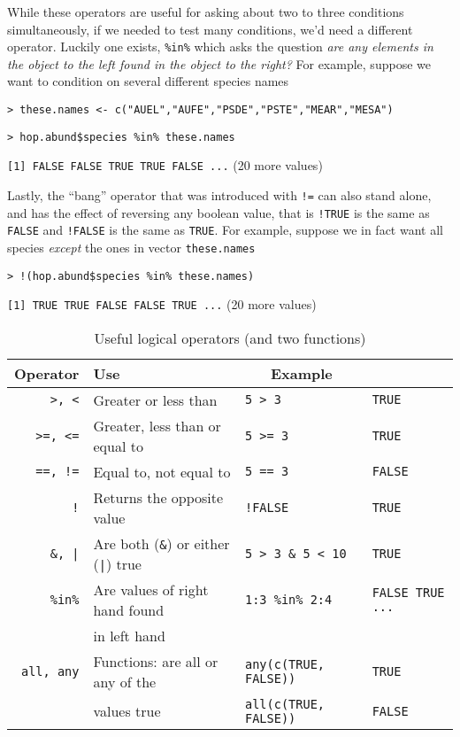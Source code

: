 \documentclass[12pt]{article}
\newcommand{\R}[1] {
	\item \texttt{#1}
}
\newenvironment{verbatim}{ 
	\indent
	\begin{list}{}{\setlength{\itemsep}{-1.5mm}}
}{
	\end{list}
}
\begin{document}
While these operators are useful for asking about two to three conditions simultaneously, if we needed to test many conditions, we'd need a different operator.  Luckily one exists, \texttt{\%in\%} which asks the question \emph{are any elements in the object to the left found in the object to the right?}  For example, suppose we want to condition on several different species names
\begin{verbatim}
	\R{> these.names <- c("AUEL","AUFE","PSDE","PSTE","MEAR","MESA")}
	\R{> hop.abund\$species \%in\% these.names}
	\R{[1] FALSE FALSE TRUE TRUE FALSE ...} (20 more values)
\end{verbatim}

Lastly, the ``bang'' operator that was introduced with \verb+!=+ can also stand alone, and has the effect of reversing any boolean value, that is \verb+!TRUE+ is the same as \verb+FALSE+ and \verb+!FALSE+ is the same as \verb+TRUE+.  For example, suppose we in fact want all species \emph{except} the ones in vector \verb+these.names+
\begin{verbatim}
	\R{> !(hop.abund\$species \%in\% these.names)}
	\R{[1] TRUE TRUE FALSE FALSE TRUE ...} (20 more values)
\end{verbatim}

\begin{table}[!htb]
	\caption{Useful logical operators (and two functions)}
	\begin{tabular}{r l l l}
		\hline
		Operator 		&	\multicolumn{1}{l}{Use}					&	\multicolumn{1}{c}{Example}				\\
		\hline
		\verb+>, <+	&	Greater or less than						&	\verb+5 > 3+			&	\verb+TRUE+	\\
		\verb+>=, <=+	&	Greater, less than or equal to				&	\verb+5 >= 3+			&	\verb+TRUE+	\\
		\verb+==, !=+	&	Equal to, not equal to					&	\verb+5 == 3+			&	\verb+FALSE+	\\
		\verb+!+		&	Returns the opposite value				&	\verb+!FALSE+			&	\verb+TRUE+ 	\\
		\texttt{\&, |}		&	Are both (\texttt{\&}) or either (\verb+|+) true	&	\texttt{5 > 3 \& 5 < 10}	&	\verb+TRUE+	\\
		\texttt{\%in\%}	&	Are values of right hand found			 	&	\texttt{1:3 \%in\% 2:4}	&	\verb+FALSE TRUE ...+	\\
					&	in left hand							&						&				\\
		\verb+all, any+	&	Functions: are all or any of the  			&	\verb+any(c(TRUE, FALSE))+	&	\verb+TRUE+	\\
					&	values true							&	\verb+all(c(TRUE, FALSE))+	&	\verb+FALSE+	\\
		\hline
	\end{tabular}
\end{table}
\end{document}
